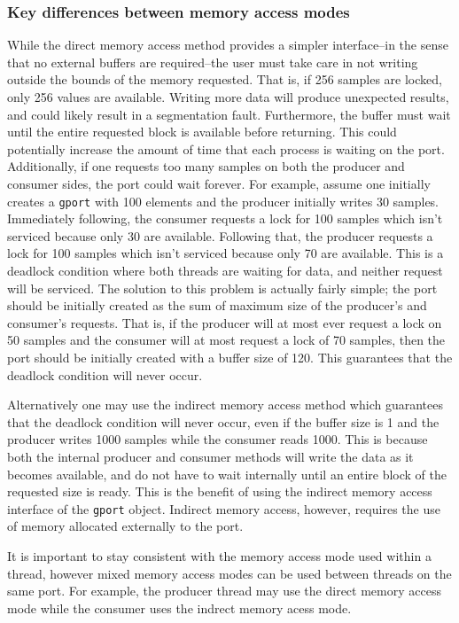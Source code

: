 \subsubsection{Key differences between memory access modes}
While the direct memory access method provides a simpler interface--in the
sense that no external buffers are required--the user must take care in not
writing outside the bounds of the memory requested.
That is, if 256 samples are locked, only 256 values are available.
Writing more data will produce unexpected results, and could likely result in
a segmentation fault.
Furthermore, the buffer must wait until the entire requested block is
available before returning.
This could potentially increase the amount of time that each process is
waiting on the port.
Additionally, if one requests too many samples on both the producer and
consumer sides, the port could wait forever.
For example, assume one initially creates a {\tt gport} with 100 elements and
the producer initially writes 30 samples.
Immediately following, the consumer requests a lock for 100 samples which
isn't serviced because only 30 are available.
Following that, the producer requests a lock for 100 samples which isn't
serviced because only 70 are available.
This is a deadlock condition where both threads are waiting for data, and
neither request will be serviced.
The solution to this problem is actually fairly simple; the port should be
initially created as the sum of maximum size of the producer's and consumer's
requests.
That is, if the producer will at most ever request a lock on 50 samples and
the consumer will at most request a lock of 70 samples, then the port should
be initially created with a buffer size of 120.
This guarantees that the deadlock condition will never occur.

Alternatively one may use the indirect memory access method which guarantees
that the deadlock condition will never occur, even if the buffer size is 1 and
the producer writes 1000 samples while the consumer reads 1000.
This is because both the internal producer and consumer methods will write
the data as it becomes available, and do not have to wait internally until an
entire block of the requested size is ready.
This is the benefit of using the indirect memory access interface of the
{\tt gport} object.
Indirect memory access, however, requires the use of memory allocated
externally to the port.

It is important to stay consistent with the memory access mode used within a
thread, however mixed memory access modes can be used between threads on the
same port.
For example, the producer thread may use the direct memory access mode while
the consumer uses the indrect memory acess mode.

